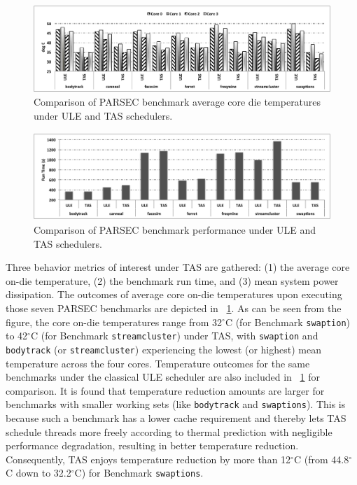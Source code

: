\documentclass[times, 10pt,twocolumn]{IEEEtran}
\begin{document}
\begin{figure}[tbp] 
\centering
  \includegraphics[width=1.0\linewidth,height=1.3in]{graphics/parsectemp}
  \caption{Comparison of PARSEC benchmark average core die temperatures
under ULE and TAS schedulers.}
  \label{fig:pbenchmarkt}
\end{figure}
\begin{figure}[tbp]
  \includegraphics[width=1.0\linewidth,height=1.3in]{graphics/parsecperformance}
  \caption{Comparison of PARSEC benchmark performance under ULE and TAS
schedulers.}
  \label{fig:pbenchmarkp}
\end{figure} 
Three behavior metrics of interest under TAS are gathered: (1) the
average core on-die temperature, (2) the benchmark run time, and (3)
mean system power dissipation.  The outcomes of average core on-die
temperatures upon executing those seven PARSEC benchmarks are depicted
in \figurename~\ref{fig:pbenchmarkt}.  As can be seen from the figure,
the core on-die temperatures range from 32$^\circ$C (for Benchmark
\texttt{swaption}) to 42$^\circ$C (for Benchmark \texttt{streamcluster})
under TAS, with \texttt{swaption} and \texttt{bodytrack} (or
\texttt{streamcluster}) experiencing the lowest (or highest) mean
temperature across the four cores.  Temperature outcomes for the same
benchmarks under the classical ULE scheduler are also included in
\figurename~\ref{fig:pbenchmarkt} for comparison.  It is found that
temperature reduction amounts are larger for benchmarks with smaller
working sets (like \texttt{bodytrack} and \texttt{swaptions}).  This is
because such a benchmark has a lower cache requirement \cite{Bienia2011}
and thereby lets TAS schedule threads more freely according to thermal
prediction with negligible performance degradation, resulting in better
temperature reduction.  Consequently, TAS enjoys temperature reduction
by more than 12$^{\circ}$C (from 44.8$^{\circ}$C down to
32.2$^{\circ}$C) for Benchmark \texttt{swaptions}.
  
\end{document}
